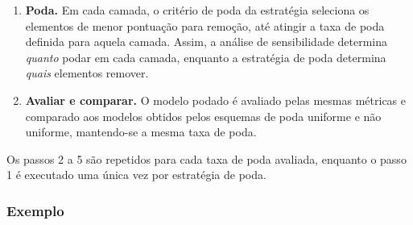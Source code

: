 \begin{enumerate}
          Enquanto nenhuma camada atinge o teto, o fator é obtido diretamente, pela divisão
          da taxa de poda pretendida pela média ponderada das tolerâncias, já ajustadas pelo
          parâmetro de intensidade. Quando alguma
          camada atinge o teto, essa divisão deixa de valer, pois a taxa dessa camada fica
          fixada no teto e o excedente redistribuído altera a média; o fator é então
          determinado por tentativas sucessivas, ajustado até que a média ponderada das
          taxas resultantes coincida com a taxa de poda pretendida.
    \item \textbf{Poda.} Em cada camada, o critério de poda da estratégia seleciona os
          elementos de menor pontuação para remoção, até atingir a taxa de poda definida para
          aquela camada. Assim, a análise de sensibilidade determina \textit{quanto} podar em
          cada camada, enquanto a estratégia de poda determina \textit{quais} elementos
          remover.
    \item \textbf{Avaliar e comparar.} O modelo podado é avaliado pelas mesmas métricas
          e comparado aos modelos obtidos pelos esquemas
          de poda uniforme e não uniforme, mantendo-se a mesma taxa de poda.
\end{enumerate}

Os passos 2 a 5 são repetidos para cada taxa de poda avaliada, enquanto o passo 1 é
executado uma única vez por estratégia de poda.

\subsubsection*{Exemplo}

